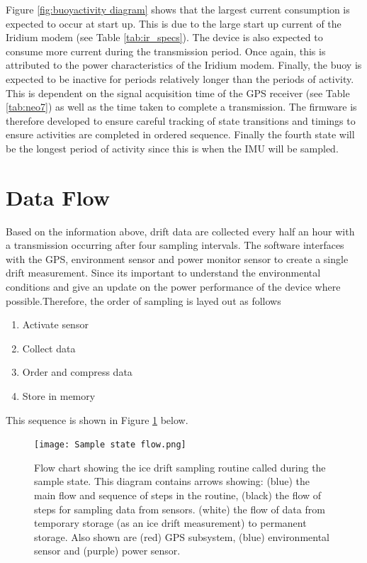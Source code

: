 Figure \ref{fig:buoyactivity diagram} shows that the largest current consumption is expected to occur at start up. This is due to the large start up current of the Iridium modem (see Table \ref{tab:ir_specs}). The device is also expected to consume more current during the transmission period. Once again, this is attributed to the power characteristics of the Iridium modem. Finally, the buoy is expected to be inactive for periods relatively longer than the periods of activity. This is dependent on the signal acquisition time of the GPS receiver (see Table \ref{tab:neo7}) as well as the time taken to complete a transmission. The firmware is therefore developed to ensure careful tracking of state transitions and timings to ensure activities are completed in ordered sequence. Finally the fourth state will be the longest period of activity since this is when the IMU will be sampled.
\section{Data Flow}
\label{sec:data_flow}

Based on the information above, drift data are collected every half an hour with a transmission occurring after four sampling intervals. The software interfaces with the GPS, environment sensor and power monitor sensor to create a single drift measurement. Since its important to understand the environmental conditions and give an update on the power performance of the device where possible.Therefore, the order of sampling is layed out as follows

\begin{enumerate}
	\item Activate sensor
	\item Collect data
	\item Order and compress data
	\item Store in memory
\end{enumerate}

This sequence is shown in Figure \ref{fig:sampleflow} below.

\begin{figure}[H]
	\centering
	\texttt{[image: Sample state flow.png]}
	\caption{Flow chart showing the ice drift sampling routine called during the sample state. This diagram contains arrows showing: (blue) the main flow  and sequence of steps in the routine, (black) the flow of steps for sampling data from sensors. (white) the flow of data from temporary storage (as an ice drift measurement) to permanent storage. Also shown are (red) GPS subsystem, (blue) environmental sensor and (purple) power sensor.}
	\label{fig:sampleflow}
\end{figure}

